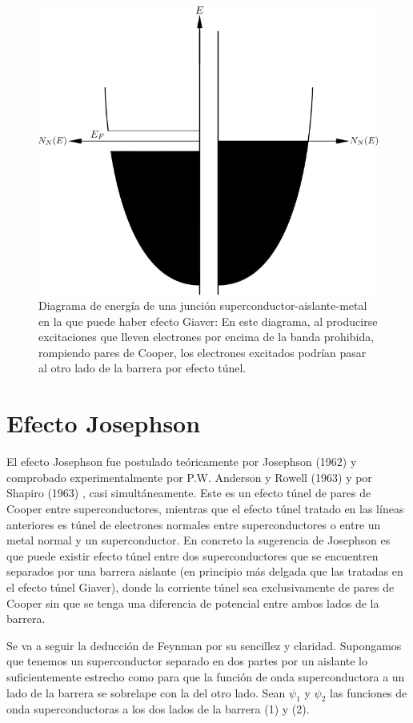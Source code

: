 \begin{figure}[H]
\centering \includegraphics[width=0.8\linewidth]{img/el3.png}
\caption[Diagrama de energía de una junción superconductor-aislante-metal en la que puede haber efecto Giaver]{Diagrama de energía de una junción superconductor-aislante-metal en la que puede haber efecto Giaver: En este diagrama, al producirse excitaciones que lleven electrones por encima de la banda prohibida, rompiendo pares de Cooper, los electrones excitados podrían pasar al otro lado de la barrera por efecto túnel.}
\label{fig:el3}
\end{figure}

\section{Efecto Josephson}

El efecto Josephson fue postulado teóricamente por Josephson (1962) \cite{josephson} y comprobado experimentalmente por P.W. Anderson y Rowell (1963) \cite{rowell} y por Shapiro (1963) \cite{shapiro}, casi simultáneamente. Este es un efecto túnel de pares de Cooper entre superconductores, mientras que el efecto túnel tratado en las líneas anteriores es túnel de electrones normales entre superconductores o entre un metal normal y un superconductor. En concreto la sugerencia de Josephson es que puede existir efecto túnel entre dos superconductores que se encuentren separados por una barrera aislante (en principio más delgada que las tratadas en el efecto túnel Giaver), donde la corriente túnel sea exclusivamente de pares de Cooper sin que se tenga una diferencia de potencial entre ambos lados de la barrera.

Se va a seguir la deducción de Feynman por su sencillez y claridad. Supongamos que tenemos un superconductor separado en dos partes por un aislante lo suficientemente estrecho como para que la función de onda superconductora a un lado de la barrera se sobrelape con la del otro lado. Sean $\psi_1$ y $\psi_2$ las funciones de onda superconductoras a los dos lados de la barrera (1) y (2).

